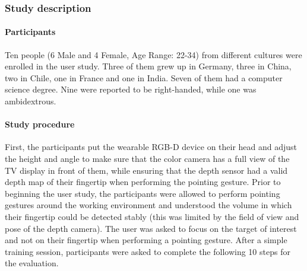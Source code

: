 \subsubsection{Study description}
\paragraph{Participants} Ten people (6 Male and 4 Female, Age Range: 22-34) from different cultures were enrolled in the user study. Three of them grew up in Germany, three in China, two in Chile, one in France and one in India. Seven of them had a computer science degree. Nine were reported to be right-handed, while one was ambidextrous.

\paragraph{Study procedure} First, the participants put the wearable RGB-D device on their head and adjust the height and angle to make sure that the color camera has a full view of the TV display in front of them, while ensuring that the depth sensor had a valid depth map of their fingertip when performing the pointing gesture. Prior to beginning the user study, the participants were allowed to perform pointing gestures around the working environment and understood the volume in which their fingertip could be detected stably (this was limited by the field of view and pose of the depth camera). The user was asked to focus on the target of interest and not on their fingertip when performing a pointing gesture. After a simple training session, participants were asked to complete the following 10 steps for the evaluation. 
